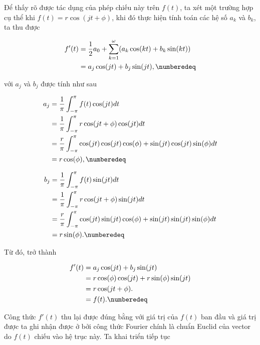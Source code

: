 		 Để thấy rõ được tác dụng của phép chiếu này trên $f(t)$, ta xét một trường hợp cụ thể khi $f(t) = r \cos(j t + \phi)$, khi đó thực hiện tính toán các hệ số $a_k$ và $b_k$, ta thu được
		
			\begin{align*}
				f'(t)	& = \frac{1}{2} a_0 + \sum_{k=1}^{\omega} (a_k \cos(kt) + b_k \sin(kt)) \\
						& = a_j \cos(jt) + b_j \sin(jt), \numberedeq
				\label{fourier::ex_f'}
			\end{align*}
		
		\noindent với $a_j$ và $b_j$ được tính như sau
		
			\begin{align*}
				a_j	& = \frac{1}{\pi} \int_{-\pi}^{\pi} f(t) \cos(j t) dt \\
					& = \frac{1}{\pi} \int_{-\pi}^{\pi} r \cos(j t + \phi) \cos(j t) dt \\
					& = \frac{r}{\pi} \int_{-\pi}^{\pi} \cos(j t) \cos(j t) \cos(\phi) + \sin(j t) \cos(j t) \sin(\phi) dt \\
					& = r \cos(\phi), \numberedeq
			\end{align*}
			
			\begin{align*}
				b_j	& = \frac{1}{\pi} \int_{-\pi}^{\pi} f(t) \sin(j t) dt \\
					& = \frac{1}{\pi} \int_{-\pi}^{\pi} r \cos(j t + \phi) \sin(j t) dt \\
					& = \frac{r}{\pi} \int_{-\pi}^{\pi} \cos(j t) \sin(j t) \cos(\phi) + \sin(j t) \sin(j t) \sin(\phi) dt \\
					& = r \sin(\phi). \numberedeq
			\end{align*}
	
		Từ đó,  trở thành
		
			\begin{align*}
				f'(t)	& = a_j \cos(jt) + b_j \sin(jt) \\
						& = r \cos(\phi) \cos(jt) + r \sin(\phi) \sin(jt) \\
						& = r \cos(jt + \phi). \\
						& = f(t). \numberedeq
			\end{align*}
		
		Công thức $f'(t)$ thu lại được đúng bằng với giá trị của $f(t)$ ban đầu và giá trị được ta ghi nhận được ở  bởi công thức Fourier chính là chuẩn Euclid của vector do $f(t)$ chiếu vào hệ trục này. Ta khai triển tiếp tục
		
